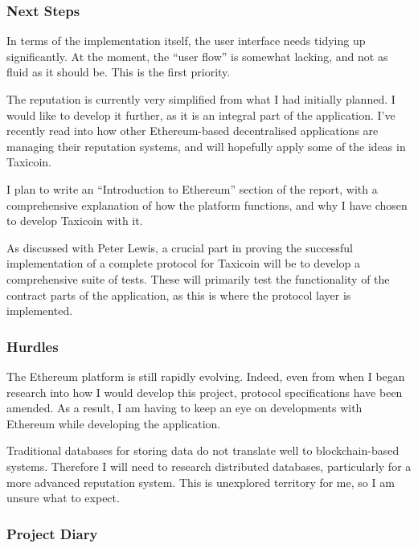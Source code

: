 \subsubsection*{Next Steps}

In terms of the implementation itself, the user interface needs tidying up significantly. At the moment, the ``user flow'' is somewhat lacking, and not as fluid as it should be. This is the first priority.

The reputation is currently very simplified from what I had initially planned. I would like to develop it further, as it is an integral part of the application. I've recently read into how other Ethereum-based decentralised applications are managing their reputation systems, and will hopefully apply some of the ideas in Taxicoin.

I plan to write an ``Introduction to Ethereum'' section of the report, with a comprehensive explanation of how the platform functions, and why I have chosen to develop Taxicoin with it.

As discussed with Peter Lewis, a crucial part in proving the successful implementation of a complete protocol for Taxicoin will be to develop a comprehensive suite of tests. These will primarily test the functionality of the contract parts of the application, as this is where the protocol layer is implemented.

\subsubsection*{Hurdles}

The Ethereum platform is still rapidly evolving. Indeed, even from when I began research into how I would develop this project, protocol specifications have been amended. As a result, I am having to keep an eye on developments with Ethereum while developing the application.

Traditional databases for storing data do not translate well to blockchain-based systems. Therefore I will need to research distributed databases, particularly for a more advanced reputation system. This is unexplored territory for me, so I am unsure what to expect.

\subsubsection*{Project Diary}

